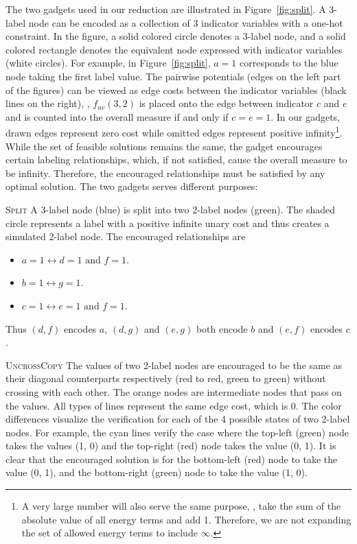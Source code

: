 % 
The two gadgets used in our reduction are illustrated in Figure~\ref{fig:split}. A 3-label node can be encoded as a collection of 3 indicator variables with a one-hot constraint. In the figure, a solid colored circle denotes a 3-label node, and a solid colored rectangle denotes the equivalent node expressed with indicator variables (white circles).  For example, in Figure~\ref{fig:split}, $a=1$ corresponds to the blue node taking the first label value. The pairwise potentials (edges on the left part of the figures) can be viewed as edge costs between the indicator variables (black lines on the right), \eg, $f_{uv}(3, 2)$ is placed onto the edge between indicator $c$ and $e$ and is counted into the overall measure if and only if $c = e = 1$. In our gadgets, drawn edges represent zero cost while omitted edges represent positive infinity\footnote{A very large number will also serve the same purpose, \eg, take the sum of the absolute value of all energy terms and add 1. Therefore, we are not expanding the set of allowed energy terms to include $\infty$.}.  While the set of feasible solutions remains the same, the gadget encourages certain labeling relationships, which, if not satisfied, cause the overall measure to be infinity. Therefore, the encouraged relationships must be satisfied by any optimal solution. The two gadgets serves different purposes:

\textsc{Split} A 3-label node (blue) is split into two 2-label nodes (green). The shaded circle represents a label with a positive infinite unary cost and thus creates a simulated 2-label node. The encouraged relationships are
\begin{itemize}
    \item $a = 1 \leftrightarrow d = 1 \text{ and } f = 1$.
    \item $b = 1 \leftrightarrow g = 1$.
    \item $c = 1 \leftrightarrow e = 1 \text{ and } f = 1$.
\end{itemize}
Thus $(d,f)$ encodes $a$, $(d,g)$ and $(e,g)$ both encode $b$ and $(e,f)$ encodes $c$.

\textsc{UncrossCopy} The values of two 2-label nodes are encouraged to be the same as their diagonal counterparts respectively (red to red, green to green) without crossing with each other. The orange nodes are intermediate nodes that pass on the values. All types of lines represent the same edge cost, which is 0. The color differences visualize the verification for each of the 4 possible states of two 2-label nodes.  For example, the cyan lines verify the case where the top-left (green) node takes the values (1, 0) and the top-right (red) node takes the value (0, 1).  It is clear that the encouraged solution is for the bottom-left (red) node to take the value (0, 1), and the bottom-right (green) node to take the value (1, 0).

